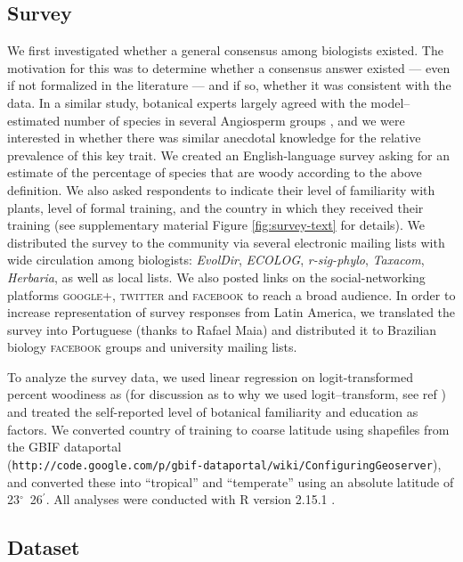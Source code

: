 \documentclass[12pt]{article}
\begin{document}
\subsection{Survey}

We first investigated whether a general consensus among biologists
existed.  The motivation for this was to determine whether a consensus
answer existed --- even if not formalized in the literature --- and if
so, whether it was consistent with the data.
% 
In a similar study, botanical experts largely agreed with the
model--estimated number of species in several Angiosperm groups
\citep{joppa2010}, and we were interested in whether there was similar
anecdotal knowledge for the relative prevalence of this key trait.
%
We created an English-language survey asking for an estimate of the
percentage of species that are woody according to the above
definition.  We also asked respondents to indicate their level of
familiarity with plants, level of formal training, and the country in
which they received their training (see supplementary material Figure
\ref{fig:survey-text} for details).
%
We distributed the survey to the community via several electronic
mailing lists with wide circulation among biologists: \emph{EvolDir},
\emph{ECOLOG}, \emph{\mbox{r-sig-phylo}}, \emph{Taxacom},
\emph{Herbaria}, as well as local lists. We also posted links on the
social-networking platforms \textsc{google+}, \textsc{twitter} and
\textsc{facebook} to reach a broad audience.
%
In order to increase representation of survey responses from Latin
America, we translated the survey into Portuguese (thanks to Rafael
Maia) and distributed it to Brazilian biology
\textsc{facebook} groups and university mailing lists.

To analyze the survey data, we used linear regression on
logit-transformed percent woodiness as (for discussion as to why we
used logit--transform, see ref \citep{wartonarcsine}) and treated the
self-reported level of botanical familiarity and education as factors.
We converted country of training to coarse latitude using shapefiles
from the GBIF dataportal\\
(\texttt{http://code.google.com/p/gbif-dataportal/wiki/ConfiguringGeoserver}),
and converted these into ``tropical'' and ``temperate'' using an
absolute latitude of 23$^\circ$~26$^\prime$.  All analyses were
conducted with R version 2.15.1 \citep{R}.

\subsection{Dataset}
\end{document}
